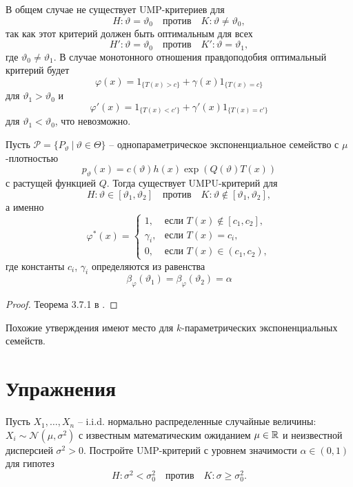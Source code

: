 \begin{rmrk}
	В общем случае не существует UMP-критериев для
	\[ H:\vartheta = \vartheta_0 \quad \text{против} \quad K:\vartheta \neq \vartheta_0, \]
	так как этот критерий должен быть оптимальным для всех
	\[ H':\vartheta = \vartheta_0 \quad \text{против} \quad K':\vartheta = \vartheta_1, \]
	где $\vartheta_0 \neq \vartheta_1$.
	В случае монотонного отношения правдоподобия оптимальный критерий будет
	\[ \varphi(x) = 1_{\{ T(x) > c \}} + \gamma(x) 1_{\{T(x) = c\}} \]
	для $\vartheta_1 > \vartheta_0$ и
	\[ \varphi'(x) = 1_{\{ T(x) < c'\}} + \gamma'(x) 1_{\{T(x) = c'\}} \]
	для $\vartheta_1 < \vartheta_0$, что невозможно.
\end{rmrk}

\begin{thm} \label{thm6.26}
	Пусть $\mathcal{P} = \{ P_\vartheta\ |\ \vartheta \in \Theta \}$ -- однопараметрическое экспоненциальное семейство с $\mu$-плотностью
	\[p_\vartheta(x) = c(\vartheta)h(x)\exp(Q(\vartheta) T(x)) \]
	с растущей функцией $Q$. Тогда существует UMPU-критерий для
	\[ H:\vartheta \in [\vartheta_1, \vartheta_2] \quad \text{против} \quad K:\vartheta \notin [\vartheta_1, \vartheta_2], \]
	а именно
	\[ \varphi^*(x) = 
	\left \{
	\begin{array}{cl}
	1, & \text{если } T(x) \notin [c_1, c_2], \\
	\gamma_i, & \text{если } T(x) = c_i, \\
	0, & \text{если } T(x) \in (c_1, c_2),
	\end{array}
	\right.
	\]
	где константы $c_i$, $\gamma_i$ определяются из равенства
	\[ \beta_\varphi(\vartheta_1) = \beta_\varphi(\vartheta_2) = \alpha \]
\end{thm}
\begin{proof}
	Теорема 3.7.1 в \cite{LehmannRomano}.
\end{proof}

\begin{rmrk}
	Похожие утверждения имеют место для $k$-параметрических экспоненциальных семейств.
\end{rmrk}

\raggedbottom
\pagebreak

\section*{Упражнения}
\begin{exc}
	Пусть $X_1, \dots, X_n$ -- i.i.d. нормально распределенные случайные величины: $X_i \sim \mathcal{N}(\mu, \sigma^2)$ с известным математическим ожиданием $\mu \in \mathbb{R}$ и неизвестной дисперсией $\sigma^2 > 0$. Постройте UMP-критерий с уровнем значимости $\alpha \in (0, 1)$ для гипотез
	\[H: \sigma^2 < \sigma_0^2 \quad \text{против} \quad K:\sigma \geq \sigma_0^2.  \]
\end{exc}

